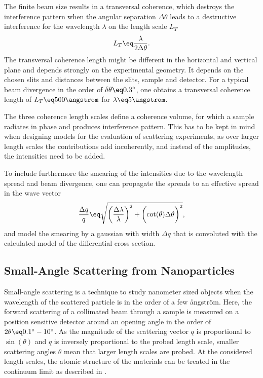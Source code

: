 \documentclass[\main/dresen_thesis.tex]{subfiles}
\begin{document}
The finite beam size results in a transversal coherence, which destroys the interference pattern when the angular separation $\Delta \theta$ leads to a destructive interference for the wavelength $\lambda$ on the length scale $L_T$
\begin{align}
  L_T \eq \frac{\lambda}{2 \Delta\theta}.
\end{align}
The transversal coherence length might be different in the horizontal and vertical plane and depends strongly on the experimental geometry.
It depends on the chosen slits and distances between the slits, sample and detector.
For a typical beam divergence in the order of $\delta \theta \eq 0.3^\circ$, one obtains a transversal coherence length of $L_T \eq 500 \angstrom$ for $\lambda \eq 5 \angstrom$.

The three coherence length scales define a coherence volume, for which a sample radiates in phase and produces interference pattern.
This has to be kept in mind when designing models for the evaluation of scattering experiments, as over larger length scales the contributions add incoherently, and instead of the amplitudes, the intensities need to be added.

To include furthermore the smearing of the intensities due to the wavelength spread and beam divergence, one can propagate the spreads to an effective spread in the wave vector
\begin{align}
  \frac{\Delta q}{q} \eq \sqrt{\biggl( \frac{\Delta \lambda}{\lambda} \biggr)^2 + \biggl( \cot (\theta) \Delta \theta \biggr)^2},
\end{align}
and model the smearing by a gaussian with width $\Delta q$ that is convoluted with the calculated model of the differential cross section.

\subsection{Small-Angle Scattering from Nanoparticles}\label{sec:theoreticalBackground:scattering:SASNanoparticles}
Small-angle scattering is a technique to study nanometer sized objects when the wavelength of the scattered particle is in the order of a few {\aa}ngstr\"om.
Here, the forward scattering of a collimated beam through a sample is measured on a position sensitive detector around an opening angle in the order of $2 \theta \eq 0.1^\circ - 10^\circ$.
As the magnitude of the scattering vector $q$ is proportional to $\sin(\theta)$ and $q$ is inversely proportional to the probed length scale, smaller scattering angles $\theta$ mean that larger length scales are probed.
At the considered length scales, the atomic structure of the materials can be treated in the continuum limit as described in .
\end{document}

